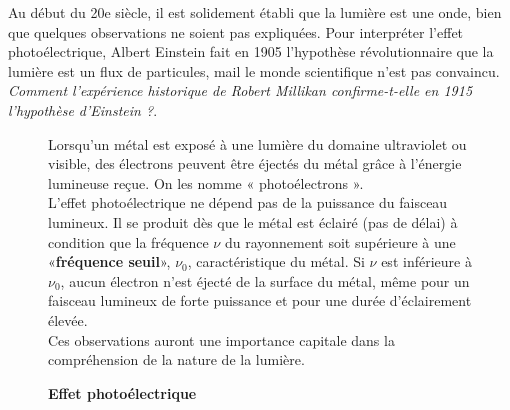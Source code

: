 \documentclass[a4paper,11pt,fleqn]{scrartcl}%
\begin{document}
\maketitle

Au début du 20e siècle, il est solidement établi que la lumière est une onde, bien que quelques observations ne soient pas expliquées. Pour interpréter l’effet photoélectrique, Albert Einstein fait en 1905 l’hypothèse révolutionnaire que la lumière est un flux de particules, mail le monde scientifique n’est pas convaincu. \emph{Comment l’expérience historique de Robert Millikan confirme-t-elle en 1915 l’hypothèse d’Einstein ?}.

\begin{figure}[h!]
	\caption{\textbf{Effet photoélectrique}}
	\label{fig1}
Lorsqu’un métal est exposé à une lumière du domaine ultraviolet ou visible, des électrons peuvent être éjectés du métal grâce à l’énergie lumineuse reçue. On les nomme « photoélectrons ».\\
L’effet photoélectrique ne dépend pas de la puissance du faisceau lumineux. Il se produit dès que le métal est éclairé (pas de délai) à condition que la fréquence $\nu$ du rayonnement soit supérieure à une «\textbf{fréquence seuil}», $\nu_0$, caractéristique du métal. Si $\nu$ est inférieure à $\nu_0$, aucun électron n’est éjecté de la surface du métal, même pour un faisceau lumineux de forte puissance et pour une durée d’éclairement élevée.\\
Ces observations auront une importance capitale dans la compréhension de la nature de la lumière.
\begin{center}
\end{center}
\end{figure}
\end{document}
